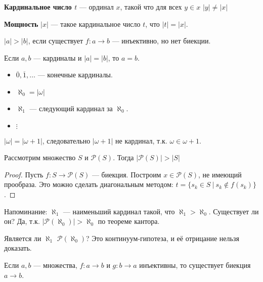 \begin{definition}
    \textbf{Кардинальное число \(t\)} --- ординал \(x\), такой что для всех \(y \in x\) \(|y| \neq |x|\)
\end{definition}

\begin{definition}
    \textbf{Мощность} \(|x|\) --- такое кардинальное число \(t\), что \(|t| = |x|\).
\end{definition}

\begin{definition}
    \(|a| > |b|\), если существует \(f : a \to b\) --- инъективно, но нет биекции.
\end{definition}

\begin{statement}
    Если \(a, b\) --- кардиналы и \(|a| = |b|\), то \(a = b\).
\end{statement}

\begin{itemize}
    \item \(\overline 0, \overline 1, \dots \) --- конечные кардиналы.
    \item \(\aleph_0 = |\omega|\)
    \item \(\aleph_1\) --- следующий кардинал за \(\aleph_0\).
    \item \(\vdots\)
\end{itemize}

\begin{example}
    \(|\omega| = |\omega + 1|\), следовательно \(|\omega + 1|\) не кардинал, т.к. \(\omega \in \omega + 1\).
\end{example}

\begin{theorem}[Кантора]
    Рассмотрим множество \(S\) и \(\mathcal{P}(S)\). Тогда \(|\mathcal{P}(S)| > |S|\)
\end{theorem}
\begin{proof}
    Пусть \(f : S \to \mathcal{P}(S)\) --- биекция. Построим \(x \in \mathcal{P}(S)\), не имеющий прообраза. Это можно сделать диагональным методом: \(t = \{s_k \in S\ |\ s_k \notin f(s_k)\}\).
\end{proof}

Напоминание: \(\aleph_1\) --- наименьший кардинал такой, что \(\aleph_1 > \aleph_0\). Существует ли он? Да, т.к. \(|\mathcal{P}(\aleph_0)| > \aleph_0\) по теореме кантора.

Является ли \(\aleph_1\) \(\mathcal{P}(\aleph_0)\)? Это континуум-гипотеза, и её отрицание нельзя доказать.

\begin{theorem}
    Если \(a, b\) --- множества, \(f : a \to b\) и \(g : b \to a\) инъективны, то существует биекция \(a \to b\).
\end{theorem}
